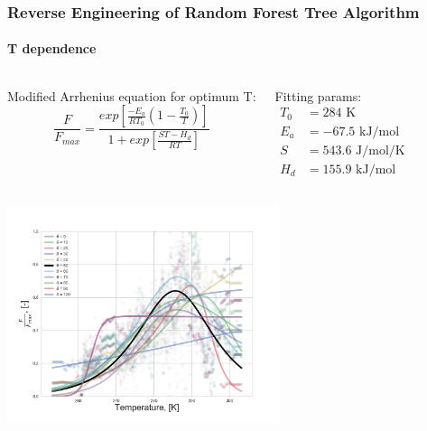 \documentclass{beamer}
\begin{document}
\begin{frame}
\frametitle{Reverse Engineering of Random Forest Tree Algorithm}
\framesubtitle{T dependence}

\begin{columns}[t]
\tiny
{}
Modified Arrhenius equation for optimum T:
\begin{equation}
    \frac{F}{F_{max}} = \frac{exp\left[\frac{-E_a}{RT_0}\left(1 - \frac{T_0}{T} \right)\right]}{1 + exp\left[ \frac{S T - H_d}{RT} \right]}
\end{equation}

\tiny
\centering
Fitting params:
\begin{align}
T_0 &= 284 \text{ K} \\
E_a &= - 67.5 \text{ kJ/mol} \\
S &= 543.6 \text{ J/mol/K} \\
H_d &= 155.9 \text{ kJ/mol}
\end{align}


\end{columns}
\centering
\includegraphics[width=0.6\textwidth]{T_dependence_all.png}
\end{frame}
\end{document}
